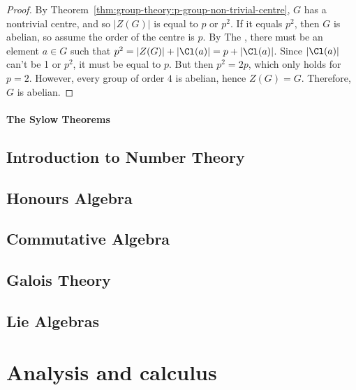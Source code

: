 \documentclass[12pt]{report}
\begin{document}
\begin{proof}
  By Theorem~\ref{thm:group-theory:p-group-non-trivial-centre}, \(G\) has a nontrivial centre, and so \(|Z(G)|\) is equal to \(p\) or \(p^{2}\). If it equals \(p^{2}\), then \(G\) is abelian, so assume the order of the centre is \(p\). By The , there must be an element \(a \in G\) such that \(p^{2} = |Z(G)| + |\Cl(a)| = p + |\Cl(a)|\). Since \(|\Cl(a)|\) can't be 1 or \(p^{2}\), it must be equal to \(p\). But then \(p^{2} = 2p\), which only holds for \(p = 2\). However, every group of order \(4\) is abelian, hence \(Z(G) = G\). Therefore, \(G\) is abelian.
\end{proof}

\subsection{The Sylow Theorems}





\chapter{Introduction to Number Theory}\label{cha:intr-numb-theory}

\chapter{Honours Algebra}\label{cha:honours-algebra}

\chapter{Commutative Algebra}\label{cha:commutative-algebra}

\chapter{Galois Theory}\label{cha:galois-theory}

\chapter{Lie Algebras}\label{cha:lie-algebras}




\part{Analysis and calculus}
\end{document}
